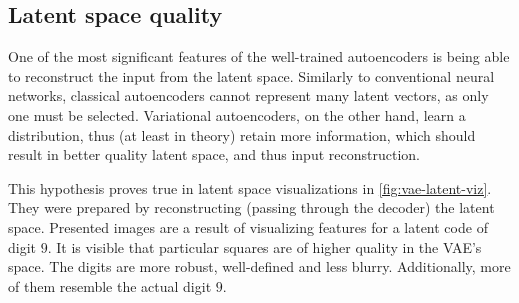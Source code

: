 \subsection{Latent space quality}
One of the most significant features of the well-trained autoencoders is being able to reconstruct the input from the latent space. Similarly to conventional neural networks, classical autoencoders cannot represent many latent vectors, as only one must be selected. Variational autoencoders, on the other hand, learn a distribution, thus (at least in theory) retain more information, which should result in better quality latent space, and thus input reconstruction.

\vspace{\baselineskip}
This hypothesis proves true in latent space visualizations in \autoref{fig:vae-latent-viz}. They were prepared by reconstructing (passing through the decoder) the latent space. Presented images are a result of visualizing features for a latent code of digit $9$. It is visible that particular squares are of higher quality in the VAE's space. The digits are more robust, well-defined and less blurry. Additionally, more of them resemble the actual digit $9$.

